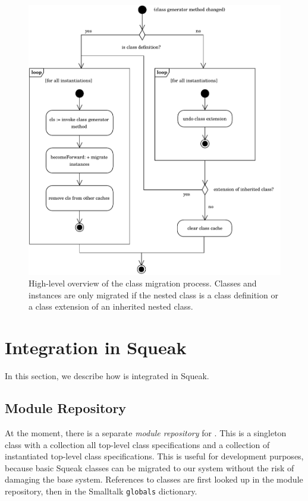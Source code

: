\begin{figure}[!htp]
	\centering
	\includegraphics[width=\textwidth]{update_cycle.pdf}
	\caption[Class migration process]{High-level overview of the class migration process. Classes and instances are only migrated if the nested class is a class definition or a class extension of an inherited nested class.}
	\label{fig:impl_update_cycle}
\end{figure}

\section{Integration in Squeak}
In this section, we describe how \msname is integrated in Squeak.

\subsection{Module Repository}
At the moment, there is a separate \emph{module repository} for \msname. This is a singleton class with a collection all top-level class specifications and a collection of instantiated top-level class specifications. This is useful for development purposes, because basic Squeak classes can be migrated to our system without the risk of damaging the base system. References to classes are first looked up in the module repository, then in the Smalltalk \texttt{globals} dictionary.

